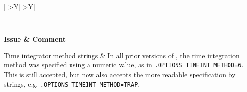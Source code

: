 


\small

\begin{longtable}[h,t,b,p] {|
>{\setlength{\hsize}{0.40\hsize}}Y|
>{\setlength{\hsize}{0.60\hsize}}Y|} 

\caption{Changes to netlist specification since the last release.\label{newUsage}} \\ \hline

\color{white}\bf Issue &
\color{white}\bf Comment
\\ \hline
\endhead

Time integrator method strings & In all prior versions of \Xyce{}, the time integration method was specified using a numeric value, as in \texttt{.OPTIONS TIMEINT METHOD=6}.  This is still accepted, but \Xyce{} now also accepts the more readable specification by strings, e.g. \texttt{.OPTIONS TIMEINT METHOD=TRAP}. \\ \hline
\end{longtable}

